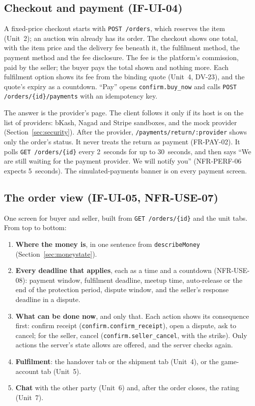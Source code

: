 \documentclass[11pt,a4paper]{article}
\begin{document}
\subsection{Checkout and payment (IF-UI-04)}
A fixed-price checkout starts with \texttt{POST /orders}, which reserves the item (Unit~2); an auction win already has its order. The checkout shows one total, with the item price and the delivery fee beneath it, the fulfilment method, the payment method and the fee disclosure. The fee is the platform's commission, paid by the seller; the buyer pays the total shown and nothing more. Each fulfilment option shows its fee from the binding quote (Unit~4, DV-23), and the quote's expiry as a countdown. ``Pay'' opens \texttt{confirm.buy\_now} and calls \texttt{POST /orders/\{id\}/payments} with an idempotency key.

The answer is the provider's page. The client follows it only if its host is on the list of providers: bKash, Nagad and Stripe sandboxes, and the mock provider (Section~\ref{sec:security}). After the provider, \texttt{/payments/return/:provider} shows only the order's status. It never treats the return as payment (FR-PAY-02). It polls \texttt{GET /orders/\{id\}} every 2~seconds for up to 30~seconds, and then says ``We are still waiting for the payment provider. We will notify you'' (NFR-PERF-06 expects 5~seconds). The simulated-payments banner is on every payment screen.

\subsection{The order view (IF-UI-05, NFR-USE-07)}
\label{sec:orderview}
One screen for buyer and seller, built from \texttt{GET /orders/\{id\}} and the unit tabs. From top to bottom:
\begin{enumerate}[nosep]
  \item \textbf{Where the money is}, in one sentence from \texttt{describeMoney} (Section~\ref{sec:moneystate}).
  \item \textbf{Every deadline that applies}, each as a time and a countdown (NFR-USE-08): payment window, fulfilment deadline, meetup time, auto-release or the end of the protection period, dispute window, and the seller's response deadline in a dispute.
  \item \textbf{What can be done now}, and only that. Each action shows its consequence first: confirm receipt (\texttt{confirm.confirm\_receipt}), open a dispute, ask to cancel; for the seller, cancel (\texttt{confirm.seller\_cancel}, with the strike). Only actions the server's state allows are offered, and the server checks again.
  \item \textbf{Fulfilment}: the handover tab or the shipment tab (Unit~4), or the game-account tab (Unit~5).
  \item \textbf{Chat} with the other party (Unit~6) and, after the order closes, the rating (Unit~7).
\end{enumerate}
\end{document}
